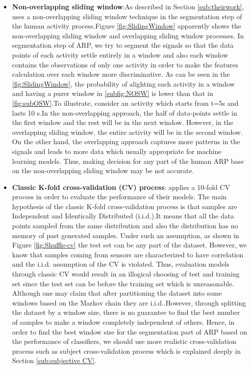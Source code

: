 \begin{itemize}
\item \textbf{Non-overlapping sliding window}:As described in Section \ref{sub:theirwork}, \cite{banos2014window} uses a non-overlapping sliding window technique in the segmentation step of the human activity process.Figure \ref{fig:SlidingWindow} apparently shows the non-overlapping sliding window and overlapping sliding window processes. In segmentation step of ARP, we try to segment the signals so that the data points of each activity settle entirely in a window and also each window contains the observations of only one activity in order to make the features calculation over each window more discriminative.
As can be seen in the \ref{fig:SlidingWindow}, the probability of alighting each activity in a window and having a purer window in \ref{subfig:NOSW} is lower than that in \ref{fig:subOSW}.To illustrate, consider an activity which starts from t=5s and lasts 10 s.In the non-overlapping approach, the half of data-points settle in the first window and the rest will be in the next window. However, in the overlapping sliding window, the entire activity will be in the second window. On the other hand, the overlapping approach captures more patterns in the signals and leads to more data which usually appropriate for machine learning models. Thus, making decision for any part of the human ARP base on the non-overlapping sliding window may be not accurate.\newline


\item \textbf{Classic K-fold cross-validation (CV) process}:
\cite{banos2014window} applies a 10-fold CV process in order to evaluate the performance of their models.
The main hypothesis of the classic K-fold cross-validation process is that samples are Independent and Identically Distributed (i.i.d.).It means that all the data points sampled from the same distribution and also the distribution has no memory of past generated samples. Under such an assumption, as shown in Figure \ref{fig:Shuffle-cv} the test set can be any part of the dataset. However, we know that samples coming from sensors are characterized to have correlation and the i.i.d. assumption of the CV is violated. Thus, evaluation models through classic CV would result in an illogical choosing of test and training set since the test set can be before the training set which is unreasonable. Although one may claim that after partitioning the dataset into some windows based on the Markov chain \cite{gilks1995markov} they are i.i.d..However, through splitting the dataset by a window size, there is no guarantee to find the best number of samples to make a window completely independent of others. Hence, in order to find the best window size for the segmentation part of ARP based on the performance of classifiers, we should use more realistic cross-validation process such as subject cross-validation process which is explained deeply in Section \ref{sub:subjective CV}.


\end{itemize}
